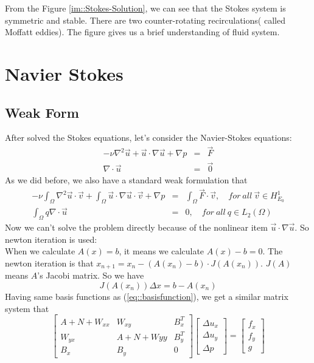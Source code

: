 \documentclass[a4paper]{article}
\begin{document}
From the Figure \ref{im::Stokes-Solution}, we can see that the Stokes system is symmetric and stable. There are two counter-rotating recirculations( called Moffatt eddies). The figure gives us a brief understanding of fluid system.


\section{Navier Stokes}
\subsection{Weak Form}
After solved the Stokes equations, let's consider the Navier-Stokes equations:
\begin{equation}
\begin{array}{rcl}
-\nu \nabla^2 \vec{u} + \vec{u}\cdot \nabla \vec{u} + \nabla p &=& \vec{F} \\
\nabla \cdot \vec{u} &=& \vec{0}
\label{eq::Navier-Stokes-problem}
\end{array}
\end{equation}
As we did before, we also have a standard weak formulation that
\begin{equation}
\begin{array}{rcl}
-\nu\int_\Omega \nabla^2 \vec{u} \cdot \vec{v}+\int_{\Omega}\vec{u}\cdot\nabla\vec{u}\cdot\vec{v} + \nabla p &=& \int_{\Omega}\vec{F}\cdot \vec{v},\quad for \ all \ \vec{v} \in H^1_{E_0} \\
\int_\Omega q\nabla \cdot \vec{u} &=&0,\quad for \ all \ q \in L_2(\Omega)
\label{eq::Navier-Stokes-weakform}
\end{array}
\end{equation}
Now we can't solve the problem directly because of the nonlinear item $\vec{u}\cdot \nabla \vec{u}$. So newton iteration is used:\\
\indent When we calculate $A(x)=b$, it means we calculate $A(x)-b=0$. The newton iteration is that $x_{n+1}=x_{n} - (A(x_n)-b)\cdot J(A(x_{n}))$. $J(A)$ means $A$'s Jacobi matrix. So we have
$$ J(A(x_n))\Delta x = b - A(x_n)$$
\indent Having same basis functions as (\ref{eq::basisfunction}), we get a similar matrix system that
\begin{equation}
\left[ \begin{array}{ccc}
A + N +W_{xx} & W_{xy} & B_x^T \\
W_{yx} & A +N +W{yy}& B_y^T \\
B_x & B_y & 0
\end{array}
\right]
\left[\begin{array}{ccc}
\Delta u_x\\
\Delta u_y\\
\Delta p
\end{array}
\right]=
\left[\begin{array}{ccc}
f_x\\
f_y\\
g
\end{array}
\right]
\label{Navier-Stokes}
\end{equation}
\end{document}
